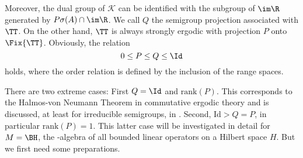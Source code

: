 \newpage

Moreover, the dual group of $\mathcal{K}$ can be identified with the subgroup of $\im\R$ generated by 
$P\sigma(A) \cap \im \R $.
We call $Q$ the semigroup projection associated with $\TT$.
On the other hand, $\TT$ is always strongly ergodic with projection $P$ onto $\Fix{\TT}$.
Obviously, the relation
\[
    0 \leq P \leq Q \leq \Id
\]
holds, where the order relation is defined by the inclusion of the range spaces.

There are two extreme cases: First $Q = \Id$ and $ \text{rank}(P)$.
This corresponds to the Halmos-von Neumann Theorem in commutative ergodic theory and is discussed, at least for irreducible semigroups, in \citet{olesenpedersentakesaki:1980}.
Second, $\text{Id} > Q = P$, in particular $\text{rank}(P) = 1$.
This latter case will be investigated in detail for $M = \BH $, the \WA-algebra of all bounded linear operators on a Hilbert space $H$.
But we first need some preparations.

